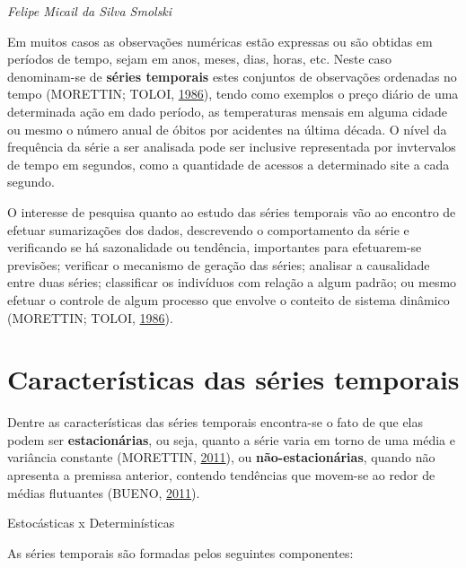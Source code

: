 \documentclass[12pt,brazil,oneside]{book}
\begin{document}
\emph{Felipe Micail da Silva Smolski}

\begin{flushright}
\emph{}
\end{flushright}

Em muitos casos as observações numéricas estão expressas ou são obtidas em períodos de tempo, sejam em anos, meses, dias, horas, etc. Neste caso denominam-se de \textbf{séries temporais} estes conjuntos de observações ordenadas no tempo (MORETTIN; TOLOI, \protect\hyperlink{ref-morettin1986}{1986}), tendo como exemplos o preço diário de uma determinada ação em dado período, as temperaturas mensais em alguma cidade ou mesmo o número anual de óbitos por acidentes na última década. O nível da frequência da série a ser analisada pode ser inclusive representada por invtervalos de tempo em segundos, como a quantidade de acessos a determinado site a cada segundo.

O interesse de pesquisa quanto ao estudo das séries temporais vão ao encontro de efetuar sumarizações dos dados, descrevendo o comportamento da série e verificando se há sazonalidade ou tendência, importantes para efetuarem-se previsões; verificar o mecanismo de geração das séries; analisar a causalidade entre duas séries; classificar os indivíduos com relação a algum padrão; ou mesmo efetuar o controle de algum processo que envolve o conteito de sistema dinâmico (MORETTIN; TOLOI, \protect\hyperlink{ref-morettin1986}{1986}).

\hypertarget{caracteristicas-das-series-temporais}{%
\section{Características das séries temporais}\label{caracteristicas-das-series-temporais}}

Dentre as características das séries temporais encontra-se o fato de que elas podem ser \textbf{estacionárias}, ou seja, quanto a série varia em torno de uma média e variância constante (MORETTIN, \protect\hyperlink{ref-morettin2011}{2011}), ou \textbf{não-estacionárias}, quando não apresenta a premissa anterior, contendo tendências que movem-se ao redor de médias flutuantes (BUENO, \protect\hyperlink{ref-Bueno2011}{2011}).

Estocásticas x Determinísticas

As séries temporais são formadas pelos seguintes componentes:
\end{document}
